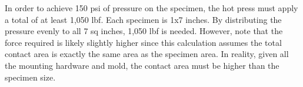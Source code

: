 
In order to achieve 150 psi of pressure on the specimen, the hot press must apply a total of at least 1,050 lbf. Each specimen is 1x7 inches. By distributing the pressure evenly to all 7 sq inches, 1,050 lbf is needed. However, note that the force required is likely slightly higher since this calculation assumes the total contact area is exactly the same area as the specimen area. In reality, given all the mounting hardware and mold, the contact area must be higher than the specimen size.
